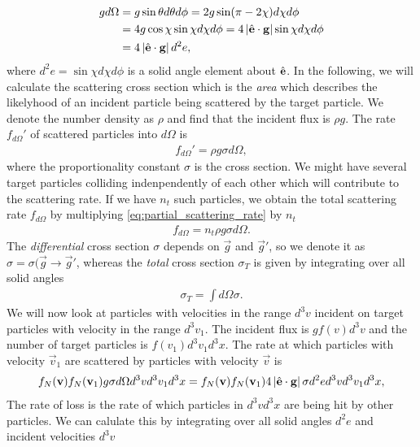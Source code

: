 \begin{align}
	g d\Omega &= g\sin\theta d\theta d\phi = 2g\sin(\pi - 2\chi)d\chi d\phi\\
	&= 4g\cos\chi\sin\chi d\chi d\phi = 4\left|\hat {\mathbf{e}}\cdot\mathbf g\right|\sin\chi d\chi d\phi\\
	&= 4\left|\hat {\mathbf{e}}\cdot\mathbf g\right|d^2e,
\end{align}
where $d^2e = \sin\chi d\chi d\phi$ is a solid angle element about $\hat {\mathbf{e}}$. In the following, we will calculate the scattering cross section which is the \textit{area} which describes the likelyhood of an incident particle being scattered by the target particle. We denote the number density as $\rho$ and find that the incident flux is $\rho g$. The rate $f_{d\Omega}'$ of scattered particles into $d\Omega$ is
\begin{align}
	\label{eq:partial_scattering_rate}
	f_{d\Omega}' = \rho g\sigma d\Omega,
\end{align}
where the proportionality constant $\sigma$ is the cross section. We might have several target particles colliding indenpendently of each other which will contribute to the scattering rate. If we have $n_t$ such particles, we obtain the total scattering rate $f_{d\Omega}$ by multiplying \eqref{eq:partial_scattering_rate} by $n_t$
\begin{align}
	f_{d\Omega} = n_t\rho g\sigma d\Omega.
\end{align}
The \textit{differential} cross section $\sigma$ depends on $\vec g$ and $\vec g'$, so we denote it as $\sigma = \sigma(\vec g\rightarrow \vec g'$, whereas the \textit{total} cross section $\sigma_T$ is given by integrating over all solid angles
\begin{align}
	\sigma_T = \int d\Omega \sigma.
\end{align}
We will now look at particles with velocities in the range $d^3 v$ incident on target particles with velocity in the range $d^3 v_1$. The incident flux is $gf(v)d^3v$ and the number of target particles is $f(v_1)d^3v_1d^3x$. The rate at which particles with velocity $\vec v_1$ are scattered by particles with velocity $\vec v$ is 
\begin{align}
	f_N(\mathbf v)f_N(\mathbf v_1) g \sigma d\Omega d^3v d^3v_1 d^3 x = f_N(\mathbf v)f_N(\mathbf v_1)4\left|\hat {\mathbf{e}}\cdot \mathbf g\right| \sigma d^2e d^3v d^3v_1 d^3 x,
\end{align}
The rate of loss is the rate of which particles in $d^3vd^3x$ are being hit by other particles. We can calulate this by integrating over all solid angles $d^2 e$ and incident velocities $d^3 v$

